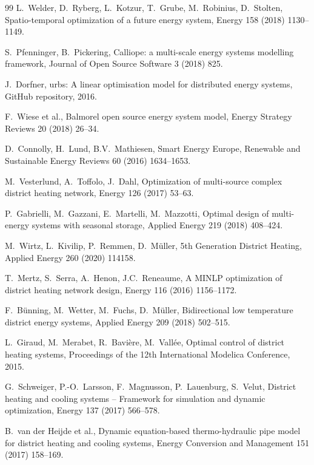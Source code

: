 \documentclass[review,3p]{elsarticle}
\begin{document}
\begin{thebibliography}{99}
L.\ Welder, D.\ Ryberg, L.\ Kotzur, T.\ Grube, M.\ Robinius,
D.\ Stolten,
Spatio-temporal optimization of a future energy system,
Energy 158 (2018) 1130--1149.

S.\ Pfenninger, B.\ Pickering,
Calliope: a multi-scale energy systems modelling framework,
Journal of Open Source Software 3 (2018) 825.

J.\ Dorfner,
urbs: A linear optimisation model for distributed energy systems,
GitHub repository, 2016.

F.\ Wiese et al.,
Balmorel open source energy system model,
Energy Strategy Reviews 20 (2018) 26--34.

D.\ Connolly, H.\ Lund, B.V.\ Mathiesen,
Smart Energy Europe,
Renewable and Sustainable Energy Reviews 60 (2016) 1634--1653.

M.\ Vesterlund, A.\ Toffolo, J.\ Dahl,
Optimization of multi-source complex district heating network,
Energy 126 (2017) 53--63.

P.\ Gabrielli, M.\ Gazzani, E.\ Martelli, M.\ Mazzotti,
Optimal design of multi-energy systems with seasonal storage,
Applied Energy 219 (2018) 408--424.

M.\ Wirtz, L.\ Kivilip, P.\ Remmen, D.\ Müller,
5th Generation District Heating,
Applied Energy 260 (2020) 114158.

T.\ Mertz, S.\ Serra, A.\ Henon, J.C.\ Reneaume,
A MINLP optimization of district heating network design,
Energy 116 (2016) 1156--1172.

F.\ Bünning, M.\ Wetter, M.\ Fuchs, D.\ Müller,
Bidirectional low temperature district energy systems,
Applied Energy 209 (2018) 502--515.

L.\ Giraud, M.\ Merabet, R.\ Bavière, M.\ Vallée,
Optimal control of district heating systems,
Proceedings of the 12th International Modelica Conference, 2015.

G.\ Schweiger, P.-O.\ Larsson, F.\ Magnusson, P.\ Lauenburg,
S.\ Velut,
District heating and cooling systems -- Framework for simulation
and dynamic optimization,
Energy 137 (2017) 566--578.

B.\ van der Heijde et al.,
Dynamic equation-based thermo-hydraulic pipe model for district
heating and cooling systems,
Energy Conversion and Management 151 (2017) 158--169.


\end{thebibliography}
\end{document}
